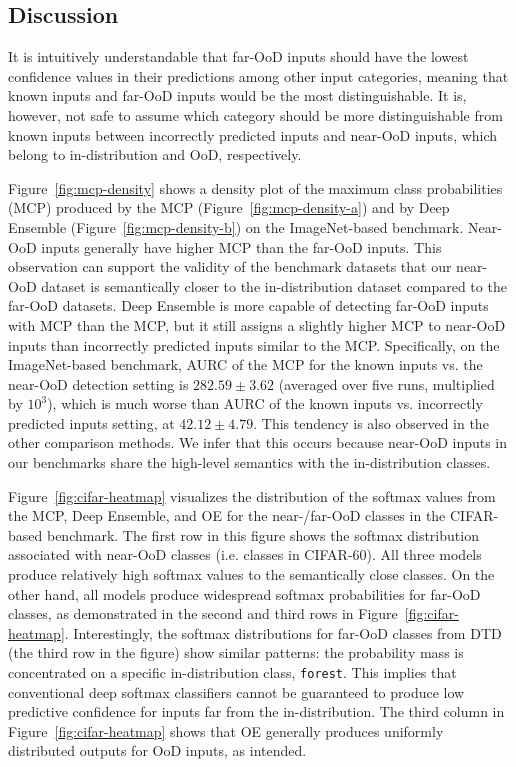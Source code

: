 \documentclass[preprint,12pt]{elsarticle}
\begin{document}
\subsection{Discussion} \label{sec:section4.3}
It is intuitively understandable that far-OoD inputs should have the lowest confidence values in their predictions among other input categories, meaning that known inputs and far-OoD inputs would be the most distinguishable. It is, however, not safe to assume which category should be more distinguishable from known inputs between incorrectly predicted inputs and near-OoD inputs, which belong to in-distribution and OoD, respectively.

Figure~\ref{fig:mcp-density} shows a density plot of the maximum class probabilities (MCP) produced by the MCP (Figure~\ref{fig:mcp-density-a}) and by Deep Ensemble (Figure~\ref{fig:mcp-density-b}) on the ImageNet-based benchmark. Near-OoD inputs generally have higher MCP than the far-OoD inputs. This observation can support the validity of the benchmark datasets that our near-OoD dataset is semantically closer to the in-distribution dataset compared to the far-OoD datasets. Deep Ensemble is more capable of detecting far-OoD inputs with MCP than the MCP, but it still assigns a slightly higher MCP to near-OoD inputs than incorrectly predicted inputs similar to the MCP. Specifically, on the ImageNet-based benchmark, AURC of the MCP for the known inputs vs. the near-OoD detection setting is $282.59\pm3.62$ (averaged over five runs, multiplied by $10^3$), which is much worse than AURC of the known inputs vs. incorrectly predicted inputs setting, at $42.12\pm4.79$. This tendency is also observed in the other comparison methods. We infer that this occurs because near-OoD inputs in our benchmarks share the high-level semantics with the in-distribution classes. 

Figure~\ref{fig:cifar-heatmap} visualizes the distribution of the softmax values from the MCP, Deep Ensemble, and OE for the near-/far-OoD classes in the CIFAR-based benchmark. The first row in this figure shows the softmax distribution associated with near-OoD classes (i.e. classes in CIFAR-60). All three models produce relatively high softmax values to the semantically close classes. On the other hand, all models produce widespread softmax probabilities for far-OoD classes, as demonstrated in the second and third rows in Figure~\ref{fig:cifar-heatmap}. Interestingly, the softmax distributions for far-OoD classes from DTD (the third row in the figure) show similar patterns: the probability mass is concentrated on a specific in-distribution class, \texttt{forest}. This implies that conventional deep softmax classifiers cannot be guaranteed to produce low predictive confidence for inputs far from the in-distribution. The third column in Figure~\ref{fig:cifar-heatmap} shows that OE generally produces uniformly distributed outputs for OoD inputs, as intended.
\end{document}
